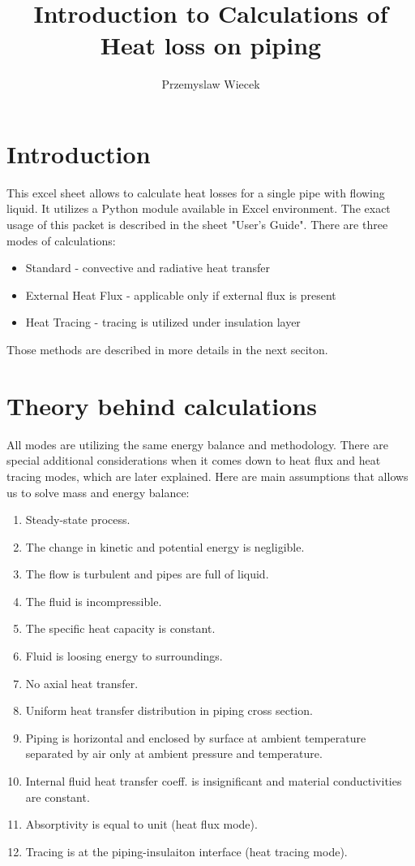 \documentclass[10pt, letterpaper]{article}
\title{Introduction to Calculations of Heat loss on piping}
\author{Przemyslaw Wiecek}
\begin{document}
\maketitle

    \section{Introduction}
    This excel sheet allows to calculate heat losses for a single pipe with flowing liquid.
    It utilizes a Python module available in Excel environment. The exact usage of this packet is described in the sheet "User's Guide". There are three modes of calculations:

	\begin{itemize}
		\item Standard - convective and radiative heat transfer
		\item External Heat Flux - applicable only if external flux is present
		\item Heat Tracing - tracing is utilized under insulation layer
	\end{itemize}

	\noindent Those methods are described in more details in the next seciton.

    \section{Theory behind calculations}
	All modes are utilizing the same energy balance and methodology. There are special additional considerations when it comes down to heat flux and heat tracing modes, which are later explained.
    Here are main assumptions that allows us to solve mass and energy balance:

	\begin{enumerate}
		\item Steady-state process.
		\item The change in kinetic and potential energy is negligible.
		\item The flow is turbulent and pipes are full of liquid.
		\item The fluid is incompressible.
		\item The specific heat capacity is constant.
		\item Fluid is loosing energy to surroundings.
		\item No axial heat transfer.
		\item Uniform heat transfer distribution in piping cross section.
		\item Piping is horizontal and enclosed by surface at ambient temperature separated by air only at ambient pressure and temperature.
		\item Internal fluid heat transfer coeff. is insignificant and material conductivities are constant.
		\item Absorptivity is equal to unit (heat flux mode).
		\item Tracing is at the piping-insulaiton interface (heat tracing mode).
	\end{enumerate}
\end{document}
